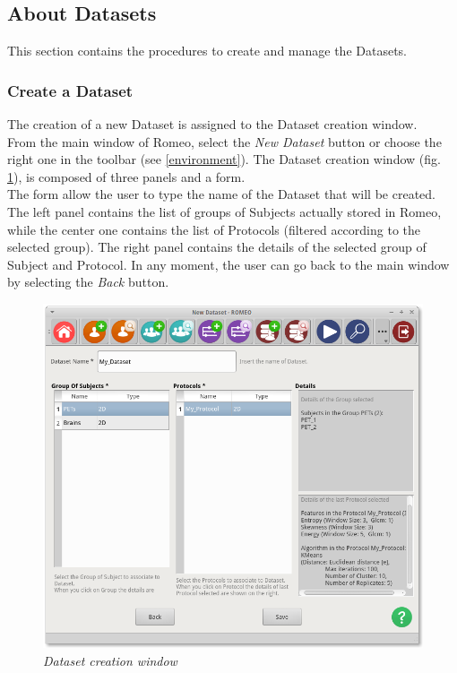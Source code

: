 \subsection{About Datasets}
\label{aboutdatasets}
This section contains the procedures to create and manage the Datasets\g{}.

\subsubsection{Create a Dataset}
\label{createdataset}
The creation of a new Dataset\g{} is assigned to the Dataset\g{} creation window.\\
From the main window of Romeo, select the \textit{New Dataset} button or choose the right one in the toolbar (see \ref{environment}). The Dataset\g{} creation window (fig. \ref{createdatasetimg}), is composed of three panels and a form.\\
The form allow the user to type the name of the Dataset\g{} that will be created. The left panel contains the list of groups of Subjects\g{} actually stored in Romeo, while the center one contains the list of Protocols\g{} (filtered according to the selected group). The right panel contains the details of the selected group of Subject\g{} and Protocol\g{}. In any moment, the user can go back to the main window by selecting the \textit{Back} button.
\begin{figure}[!h]
\begin{center}
\includegraphics[scale=0.4]{./Images/NewDatasetView}
\caption{\textit{Dataset creation window}}
\label{createdatasetimg}
\end{center}
\end{figure}
